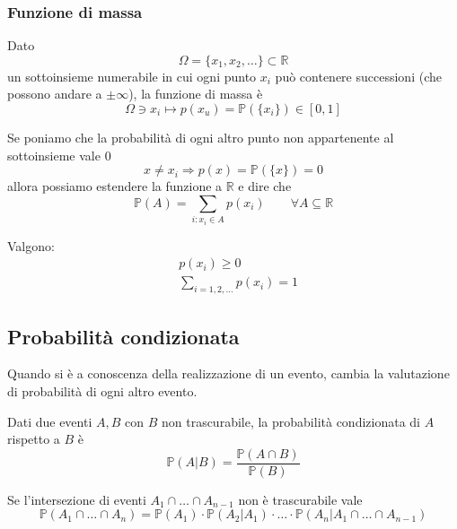 \subsubsection{Funzione di massa}
\begin{definition}
	Dato
	\begin{equation*}
		\Omega = \{x_1, x_2, \ldots\} \subset \mathbb{R}
	\end{equation*}
	un sottoinsieme numerabile in cui ogni punto $x_i$ può contenere successioni (che possono andare a $\pm \infty$), la funzione di massa è
	\begin{equation}
		\Omega \ni x_i \mapsto p(x_u) = \mathbb{P}(\{x_i\}) \in [0,1]
	\end{equation}
\end{definition}
\noindent Se poniamo che la probabilità di ogni altro punto non appartenente al sottoinsieme vale $0$
\begin{equation*}
	x \neq x_i \Longrightarrow p(x) = \mathbb{P}(\{x\}) = 0
\end{equation*}
allora possiamo estendere la funzione a $\mathbb{R}$ e dire che
\begin{equation}
	\mathbb{P}(A) = \sum_{i:x_i \in A} p(x_i) \quad\quad \forall A \subseteq \mathbb{R}
\end{equation}
\begin{proposition}
	Valgono:
	\begin{align}
		& p(x_i) \geq 0 \\
		& \sum_{i=1,2,\ldots}p(x_i) = 1
	\end{align}
\end{proposition}

\subsection{Probabilità condizionata}
Quando si è a conoscenza della realizzazione di un evento, cambia la valutazione di probabilità di ogni altro evento.
\begin{definition}
	Dati due eventi $A, B$ con $B$ non trascurabile, la probabilità condizionata di $A$ rispetto a $B$ è
	\begin{equation}
		\mathbb{P}(A \vert B) = \frac{\mathbb{P}(A \cap B)}{\mathbb{P}(B)}
	\end{equation}
\end{definition}

\begin{proposition}
	Se l'intersezione di eventi $A_1 \cap \ldots \cap A_{n-1}$ non è trascurabile vale
	\begin{equation}
		\mathbb{P}(A_1 \cap \ldots \cap A_n) = \mathbb{P} (A_1) \cdot \mathbb{P}(A_2 \vert A_1) \cdot \ldots \cdot \mathbb{P}(A_n \vert A_1 \cap \ldots \cap A_{n-1})
	\end{equation}
\end{proposition}

